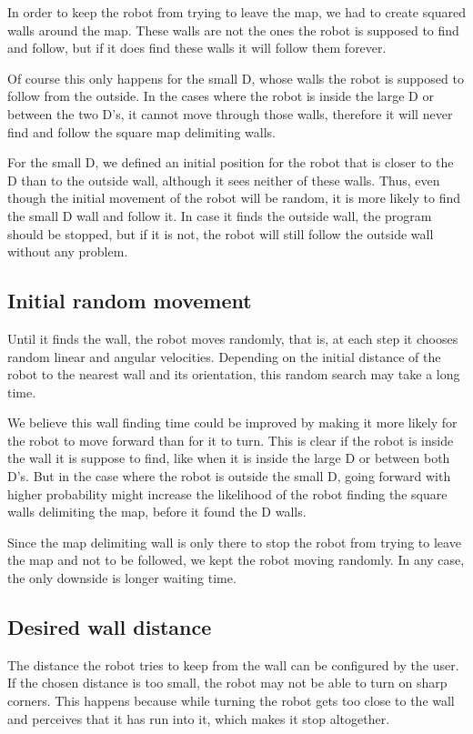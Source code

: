 \documentclass[10pt,journal,compsoc]{IEEEtran}
\begin{document}
In order to keep the robot from trying to leave the map, we had to create squared walls around the map. These walls are not the ones the robot is supposed to find and follow, but if it does find these walls it will follow them forever.

Of course this only happens for the small D, whose walls the robot is supposed to follow from the outside. In the cases where the robot is inside the large D or between the two D's, it cannot move through those walls, therefore it will never find and follow the square map delimiting walls.

For the small D, we defined an initial position for the robot that is closer to the D than to the outside wall, although it sees neither of these walls. Thus, even though the initial movement of the robot will be random, it is more likely to find the small D wall and follow it. In case it finds the outside wall, the program should be stopped, but if it is not, the robot will still follow the outside wall without any problem.

\subsection{Initial random movement}

Until it finds the wall, the robot moves randomly, that is, at each step it chooses random linear and angular velocities. Depending on the initial distance of the robot to the nearest wall and its orientation, this random search may take a long time. 

We believe this wall finding time could be improved by making it more likely for the robot to move forward than for it to turn. This is clear if the robot is inside the wall it is suppose to find, like when it is inside the large D or between both D's. But in the case where the robot is outside the small D, going forward with higher probability might increase the likelihood of the robot finding the square walls delimiting the map, before it found the D walls.

Since the map delimiting wall is only there to stop the robot from trying to leave the map and not to be followed, we kept the robot moving randomly. In any case, the only downside is longer waiting time.

\subsection{Desired wall distance}

The distance the robot tries to keep from the wall can be configured by the user. If the chosen distance is too small, the robot may not be able to turn on sharp corners. This happens because while turning the robot gets too close to the wall and perceives that it has run into it, which makes it stop altogether.
\end{document}
